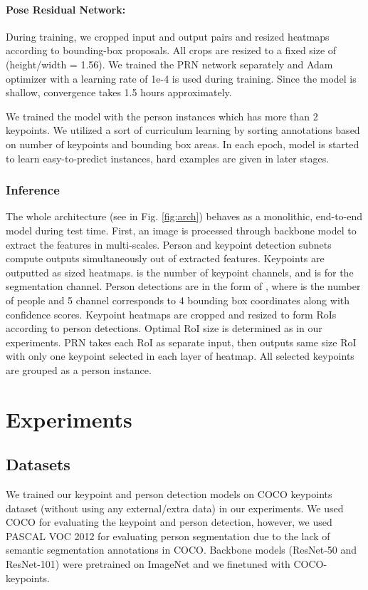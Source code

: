 \documentclass[runningheads]{llncs}
\begin{document}
\paragraph{Pose Residual Network:}
During training, we cropped input and output pairs and resized heatmaps according to bounding-box proposals. All crops are resized to a fixed size of  (height/width = 1.56). We trained the PRN network separately and Adam optimizer \cite{Kingma} with a learning rate of 1e-4 is used during training. Since the model is shallow, convergence takes 1.5 hours approximately. 


We trained the model with the person instances which has more than 2 keypoints. We utilized a sort  of curriculum learning \cite{bengio2009} by sorting annotations based on number of keypoints and bounding box areas. In each epoch, model is started to learn easy-to-predict instances, hard examples are given in later stages. 
\subsubsection{Inference}
The whole architecture (see in Fig. \ref{fig:arch}) behaves as  a monolithic, end-to-end model during test time. First, an image  is processed through backbone model to extract the features in multi-scales. Person and keypoint detection subnets compute outputs simultaneously out of extracted features. Keypoints are outputted as  sized heatmaps.  is the number of keypoint channels, and  is for the segmentation channel. Person detections are in the form of , where  is the number of people and 5 channel corresponds to 4 bounding box coordinates along with confidence scores. Keypoint heatmaps are cropped and resized to form RoIs according to person detections. Optimal RoI size is determined as  in our experiments. PRN takes each RoI as separate input, then outputs same size RoI with only one keypoint selected in each layer of heatmap. All selected keypoints are grouped as a person instance.




\section{Experiments}
\subsection{Datasets}
We trained our keypoint and person detection models on COCO keypoints dataset \cite{Lin2014} (without using any external/extra data) in our experiments. We used COCO for evaluating the keypoint and person detection, however, we used PASCAL VOC 2012\cite{Everingham15} for evaluating person segmentation due to the lack of semantic segmentation annotations in COCO. Backbone models (ResNet-50 and ResNet-101) were pretrained on ImageNet and we finetuned with COCO-keypoints.
\end{document}
